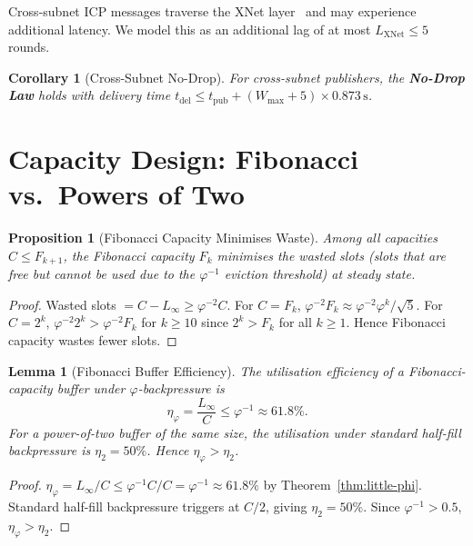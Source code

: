 \documentclass[12pt]{article}
\newtheorem{lemma}[theorem]{Lemma}
\newtheorem{corollary}[theorem]{Corollary}
\newtheorem{proposition}[theorem]{Proposition}
\newcommand{\PHI}{\varphi}
\newcommand{\PHIINV}{\varphi^{-1}}
\newcommand{\AMOR}{\varphi^{-2}}
\newcommand{\SCAP}{C}
\newcommand{\NoDrop}{\textbf{No-Drop Law}}
\begin{document}
Cross-subnet ICP messages traverse the XNet layer~\cite{DFINITY2023} and may
experience additional latency.  We model this as an additional lag of at most
$L_{\mathrm{XNet}} \le 5$ rounds.

\begin{corollary}[Cross-Subnet No-Drop]
For cross-subnet publishers, the \NoDrop{} holds with delivery time
$t_{\mathrm{del}} \le t_{\mathrm{pub}} + (W_{\max} + 5) \times 0.873\,\mathrm{s}$.
\end{corollary}

\section{Capacity Design: Fibonacci vs.\ Powers of Two}
\label{sec:capacity}

\begin{proposition}[Fibonacci Capacity Minimises Waste]
Among all capacities $\SCAP \le F_{k+1}$, the Fibonacci capacity $F_k$ minimises
the wasted slots (slots that are free but cannot be used due to the $\PHIINV$
eviction threshold) at steady state.
\end{proposition}

\begin{proof}
Wasted slots $= \SCAP - L_\infty \ge \AMOR \SCAP$.  For $\SCAP = F_k$,
$\AMOR F_k \approx \AMOR \PHI^k / \sqrt{5}$.  For $\SCAP = 2^k$,
$\AMOR 2^k > \AMOR F_k$ for $k \ge 10$ since $2^k > F_k$ for all $k \ge 1$.
Hence Fibonacci capacity wastes fewer slots.
\end{proof}

\begin{lemma}[Fibonacci Buffer Efficiency]
\label{lem:fib-eff}
The \emph{utilisation efficiency} of a Fibonacci-capacity buffer under
$\varphi$-backpressure is
\[
  \eta_\PHI = \frac{L_\infty}{\SCAP} \le \PHIINV \approx 61.8\%.
\]
For a power-of-two buffer of the same size, the utilisation under standard
half-fill backpressure is $\eta_2 = 50\%$.  Hence $\eta_\PHI > \eta_2$.
\end{lemma}

\begin{proof}
$\eta_\PHI = L_\infty / \SCAP \le \PHIINV \SCAP / \SCAP = \PHIINV \approx
61.8\%$ by Theorem~\ref{thm:little-phi}.  Standard half-fill backpressure
triggers at $\SCAP/2$, giving $\eta_2 = 50\%$.  Since $\PHIINV > 0.5$,
$\eta_\PHI > \eta_2$.
\end{proof}
\end{document}
